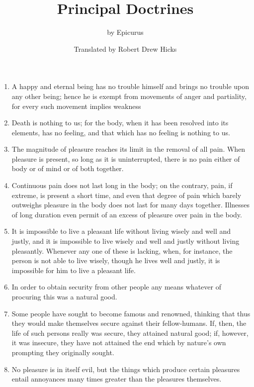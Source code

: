 \documentclass[12pt]{article}
\title{\vspace{-2cm}\bfseries{Principal Doctrines}\vspace{-8mm}}
\author{by Epicurus}
\date{\vspace{-1em} \normalsize Translated by Robert Drew Hicks \vspace{-1em}}
\begin{document}
\maketitle
\begin{enumerate}[leftmargin=.5cm]
	\item A happy and eternal being has no trouble himself and brings no trouble upon any other being; hence he is exempt from movements of anger and partiality, for every such movement implies weakness 

	\item Death is nothing to us; for the body, when it has been resolved into its elements, has no feeling, and that which has no feeling is nothing to us. 

	\item The magnitude of pleasure reaches its limit in the removal of all pain. When pleasure is present, so long as it is uninterrupted, there is no pain either of body or of mind or of both together. 

	\item Continuous pain does not last long in the body; on the contrary, pain, if extreme, is present a short time, and even that degree of pain which barely outweighs pleasure in the body does not last for many days together. Illnesses of long duration even permit of an excess of pleasure over pain in the body. 
	
	\item It is impossible to live a pleasant life without living wisely and well and justly, and it is impossible to live wisely and well and justly without living pleasantly. Whenever any one of these is lacking, when, for instance, the person is not able to live wisely, though he lives well and justly, it is impossible for him to live a pleasant life. 

	\item In order to obtain security from other people any means whatever of procuring this was a natural good. 

	\item Some people have sought to become famous and renowned, thinking that thus they would make themselves secure against their fellow-humans. If, then, the life of such persons really was secure, they attained natural good; if, however, it was insecure, they have not attained the end which by nature's own prompting they originally sought. 

	\item No pleasure is in itself evil, but the things which produce certain pleasures entail annoyances many times greater than the pleasures themselves. 


\end{enumerate}
\end{document}
